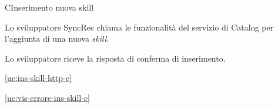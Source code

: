 \begin{usecase}{3}{C}{Inserimento nuova skill}



	\begin{ucscenarioprincipale}
		\item Lo sviluppatore SyncRec chiama le funzionalità del servizio di Catalog per l'aggiunta di una nuova \textit{skill}.
		\item Lo sviluppatore riceve la risposta di conferma di inserimento.
	\end{ucscenarioprincipale}


	\begin{ucgeneralizzazioni}
		\item \ref{uc:ins-skill-http-c}
	\end{ucgeneralizzazioni}

	\begin{ucestensioni}
		\item \ref{uc:vis-errore-ins-skill-c}
	\end{ucestensioni}

	\label{uc:ins-skill-c}
\end{usecase}

